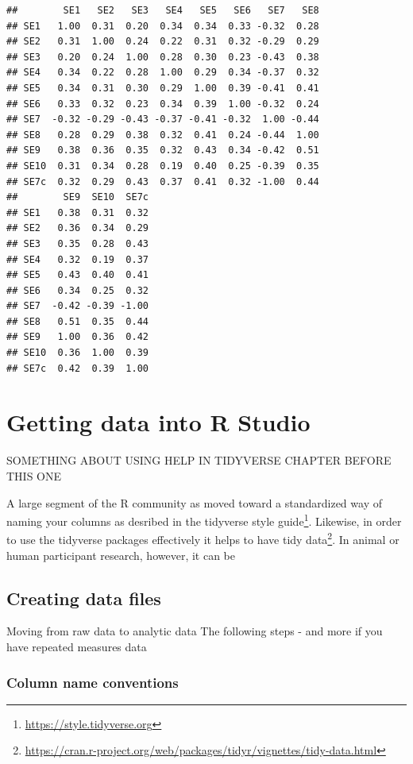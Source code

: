 \documentclass[
]{krantz}
\renewcommand{\href}[2]{#2\footnote{\url{#1}}}
\begin{document}
\begin{verbatim}
##        SE1   SE2   SE3   SE4   SE5   SE6   SE7   SE8
## SE1   1.00  0.31  0.20  0.34  0.34  0.33 -0.32  0.28
## SE2   0.31  1.00  0.24  0.22  0.31  0.32 -0.29  0.29
## SE3   0.20  0.24  1.00  0.28  0.30  0.23 -0.43  0.38
## SE4   0.34  0.22  0.28  1.00  0.29  0.34 -0.37  0.32
## SE5   0.34  0.31  0.30  0.29  1.00  0.39 -0.41  0.41
## SE6   0.33  0.32  0.23  0.34  0.39  1.00 -0.32  0.24
## SE7  -0.32 -0.29 -0.43 -0.37 -0.41 -0.32  1.00 -0.44
## SE8   0.28  0.29  0.38  0.32  0.41  0.24 -0.44  1.00
## SE9   0.38  0.36  0.35  0.32  0.43  0.34 -0.42  0.51
## SE10  0.31  0.34  0.28  0.19  0.40  0.25 -0.39  0.35
## SE7c  0.32  0.29  0.43  0.37  0.41  0.32 -1.00  0.44
##        SE9  SE10  SE7c
## SE1   0.38  0.31  0.32
## SE2   0.36  0.34  0.29
## SE3   0.35  0.28  0.43
## SE4   0.32  0.19  0.37
## SE5   0.43  0.40  0.41
## SE6   0.34  0.25  0.32
## SE7  -0.42 -0.39 -1.00
## SE8   0.51  0.35  0.44
## SE9   1.00  0.36  0.42
## SE10  0.36  1.00  0.39
## SE7c  0.42  0.39  1.00
\end{verbatim}

\hypertarget{getting-data-into-r-studio}{%
\chapter{Getting data into R Studio}\label{getting-data-into-r-studio}}

SOMETHING ABOUT USING HELP IN TIDYVERSE CHAPTER BEFORE THIS ONE

A large segment of the R community as moved toward a standardized way of naming your columns as desribed in the \href{https://style.tidyverse.org}{tidyverse style guide}. Likewise, in order to use the tidyverse packages effectively it helps to have \href{https://cran.r-project.org/web/packages/tidyr/vignettes/tidy-data.html}{tidy data}. In animal or human participant research, however, it can be

\hypertarget{creating-data-files}{%
\section{Creating data files}\label{creating-data-files}}

Moving from raw data to analytic data
The following steps - and more if you have repeated measures data

\hypertarget{column-name-conventions}{%
\subsection{Column name conventions}\label{column-name-conventions}}
\end{document}
